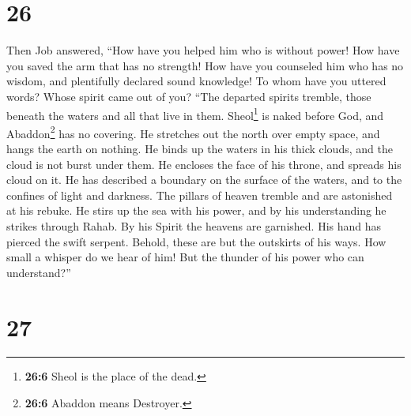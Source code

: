 \hypertarget{section-19}{%
\section{26}\label{section-19}}

 Then Job answered,  ``How have you helped
him who is without power! How have you saved the arm that has no
strength!  How have you counseled him who has no wisdom,
and plentifully declared sound knowledge!  To whom have
you uttered words? Whose spirit came out of you?  ``The
departed spirits tremble, those beneath the waters and all that live in
them.  Sheol\footnote{\textbf{26:6} Sheol is the place of
  the dead.} is naked before God, and Abaddon\footnote{\textbf{26:6}
  Abaddon means Destroyer.} has no covering.  He stretches
out the north over empty space, and hangs the earth on nothing.
 He binds up the waters in his thick clouds, and the cloud
is not burst under them.  He encloses the face of his
throne, and spreads his cloud on it.  He has described a
boundary on the surface of the waters, and to the confines of light and
darkness.  The pillars of heaven tremble and are
astonished at his rebuke.  He stirs up the sea with his
power, and by his understanding he strikes through Rahab.
 By his Spirit the heavens are garnished. His hand has
pierced the swift serpent.  Behold, these are but the
outskirts of his ways. How small a whisper do we hear of him! But the
thunder of his power who can understand?''

\hypertarget{section-20}{%
\section{27}\label{section-20}}

